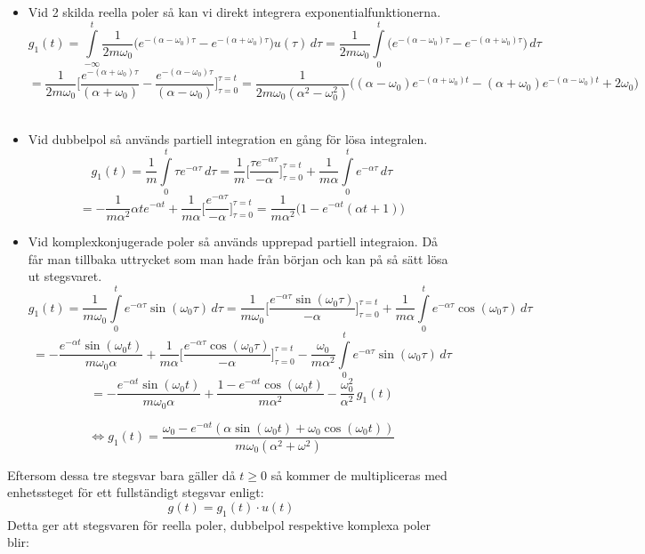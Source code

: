 \begin{itemize}
    \item Vid 2 skilda reella poler så kan vi direkt integrera exponentialfunktionerna.
    $$g_1(t)=\int\limits_{-\infty}^{t}\dfrac{1}{2m\omega_0}\bigg(e^{-(\alpha-\omega_0)\tau}-e^{-(\alpha+\omega_0)\tau}\bigg)u(\tau)\,d\tau
    =\dfrac{1}{2m\omega_0}\int\limits_{0}^{t}\bigg(e^{-(\alpha-\omega_0)\tau}-e^{-(\alpha+\omega_0)\tau}\bigg)\,d\tau$$
    $$=\dfrac{1}{2m\omega_0}\bigg[\frac{e^{-(\alpha+\omega_0)\tau}}{(\alpha+\omega_0)}-\frac{e^{-(\alpha-\omega_0)\tau}}{(\alpha-\omega_0)} \bigg]_{\tau=0}^{\tau=t}
    =\dfrac{1}{2m\omega_0(\alpha^2-\omega_0^2)}\bigg((\alpha-\omega_0)e^{-(\alpha+\omega_0)t}-(\alpha+\omega_0)e^{-(\alpha-\omega_0)t}+2\omega_0\bigg)$$
    \\
    \item Vid dubbelpol så används partiell integration en gång för lösa integralen.
    $$g_1(t)=\dfrac{1}{m}\int\limits_{0}^{t}\tau e^{-\alpha \tau}\,d\tau=
    \dfrac{1}{m} \bigg[\dfrac{\tau e^{-\alpha \tau}}{-\alpha}\bigg]_{\tau=0}^{\tau=t}+\dfrac{1}{m\alpha}\int\limits_{0}^{t}e^{-\alpha \tau}\,d\tau$$
    $$=-\dfrac{1}{m\alpha^2}\alpha te^{-\alpha t}+\dfrac{1}{m\alpha}\bigg[\dfrac{e^{-\alpha \tau}}{-\alpha}\bigg]_{\tau=0}^{\tau=t}=
    \dfrac{1}{m\alpha^2}\bigg(1-e^{-\alpha t}(\alpha t+1)\bigg)$$
    \newpage
    \item Vid komplexkonjugerade poler så används upprepad partiell integraion. Då får man tillbaka uttrycket som man hade från början och kan på så sätt lösa ut stegsvaret.
    $$g_1(t)=\dfrac{1}{m\omega_0}\int\limits_{0}^{t} e^{-\alpha \tau} \sin(\omega_0 \tau)\,d\tau
    =\dfrac{1}{m\omega_0}\bigg[\dfrac{e^{-\alpha \tau}\sin(\omega_0 \tau)}{-\alpha}\bigg]_{\tau=0}^{\tau=t}+\dfrac{1}{m\alpha}\int\limits_{0}^{t} e^{-\alpha \tau} \cos(\omega_0\tau)\,d\tau$$
    $$=-\dfrac{e^{-\alpha t}\sin(\omega_0 t)}{m\omega_0\alpha}+\dfrac{1}{m\alpha}\bigg[\dfrac{e^{-\alpha \tau}\cos(\omega_0 \tau)}{-\alpha}\bigg]_{\tau=0}^{\tau=t}-\dfrac{\omega_0}{m\alpha^2}\int\limits_{0}^{t}e^{-\alpha \tau} \sin(\omega_0 \tau)\,d\tau$$
    $$=-\dfrac{e^{-\alpha t}\sin(\omega_0 t)}{m\omega_0\alpha}+\dfrac{1-e^{-\alpha t}\cos(\omega_0 t)}{m\alpha^2}-\dfrac{\omega_0^2}{\alpha^2}\,g_1(t)$$
    
    $$\Longleftrightarrow g_1(t)
    =\dfrac{\omega_0-e^{-\alpha t}(\alpha\sin(\omega_0 t)+\omega_0\cos(\omega_0 t))}{m\omega_0(\alpha^2+\omega^2)}$$
\end{itemize}
Eftersom dessa tre stegsvar bara gäller då $t\ge 0$ så kommer de multipliceras med enhetssteget för ett fullständigt stegsvar enligt:
$$g(t)=g_1(t)\cdot u(t)$$
Detta ger att stegsvaren för reella poler, dubbelpol respektive komplexa poler blir:

